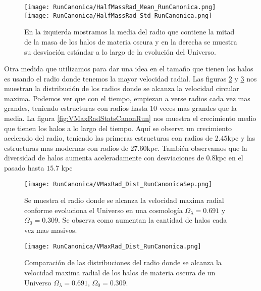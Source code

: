 \begin{figure}[ht!]
    \centering
    \texttt{[image: RunCanonica/HalfMassRad\_Mean\_RunCanonica.png]}
    \texttt{[image: RunCanonica/HalfMassRad\_Std\_RunCanonica.png]}
    \caption[Media y desviación estándar del radio de la mitad de la masa de un Universo $\Omega_\lambda = 0.691 $, $\Omega_0 = 0.309$]{\footnotesize En la izquierda mostramos la media del radio que contiene la mitad de la masa de los halos de materia oscura y en la derecha se muestra su desviación estándar a lo largo de la evolución del Universo.}
    \label{fig:HalfMassRadStatsCanonRun}
\end{figure}

Otra medida que utilizamos para dar una idea en el tamaño que tienen los halos es usando el radio donde tenemos la mayor velocidad radial. Las figuras \ref{fig:VMaxRadDistCanonRunSep} y \ref{fig:VMaxRadDistCanonRun} nos muestran la distribución de los radios donde se alcanza la velocidad circular maxima. Podemos ver que con el tiempo, empiezan a verse radios cada vez mas grandes, teniendo estructuras con radios hasta 10 veces mas grandes que la media. La figura \ref{fig:VMaxRadStatsCanonRun} nos muestra el crecimiento medio que tienen los halos a lo largo del tiempo. Aquí se observa un crecimiento acelerado del radio, teniendo las primeras estructuras con radios de $2.45$kpc y las estructuras mas modernas con radios de $27.60$kpc. También observamos que la diversidad de halos aumenta aceleradamente con desviaciones de $0.8$kpc en el pasado hasta $15.7$ kpc



\begin{figure}[ht!]
    \centering
    \texttt{[image: RunCanonica/VMaxRad\_Dist\_RunCanonicaSep.png]}
    \caption[Radio donde se alcanza la velocidad maxima radial en la evolución de un Universo $\Omega_\lambda = 0.691 $, $\Omega_0 = 0.309$]{\footnotesize Se muestra el radio donde se alcanza la velocidad maxima radial conforme evoluciona el Universo en una cosmología $\Omega_\lambda = 0.691 $ y $\Omega_0 = 0.309$. Se observa como aumentan la cantidad de halos cada vez mas masivos.}
    \label{fig:VMaxRadDistCanonRunSep}
\end{figure}

\begin{figure}[ht!]
    \centering
    \texttt{[image: RunCanonica/VMaxRad\_Dist\_RunCanonica.png]}
    \caption[Distribución del radio donde se alcanza la velocidad maxima radial de un Universo $\Omega_\lambda = 0.691 $, $\Omega_0 = 0.309$]{\footnotesize Comparación de las distribuciones del radio donde se alcanza la velocidad maxima radial de los halos de materia oscura de un Universo $\Omega_\lambda = 0.691 $, $\Omega_0 = 0.309$.}
    \label{fig:VMaxRadDistCanonRun}
\end{figure}


